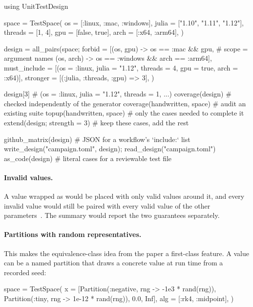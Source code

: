 \documentclass[11pt]{article}
\newcommand{\code}[1]{\texttt{\detokenize{#1}}}
\begin{document}
\begin{jlcode}
using UnitTestDesign

space = TestSpace(
    os      = [:linux, :mac, :windows],
    julia   = ["1.10", "1.11", "1.12"],
    threads = [1, 4],
    gpu     = [false, true],
    arch    = [:x64, :arm64],
)

design = all_pairs(space;
    forbid       = [(os, gpu)  -> os == :mac && gpu,             # scope = argument names
                    (os, arch) -> os == :windows && arch == :arm64],
    must_include = [(os = :linux, julia = "1.12", threads = 4, gpu = true, arch = :x64)],
    stronger     = [(:julia, :threads, :gpu) => 3],
)

design[3]                         # (os = :linux, julia = "1.12", threads = 1, ...)
coverage(design)                  # checked independently of the generator
coverage(handwritten, space)      # audit an existing suite
topup(handwritten, space)         # only the cases needed to complete it
extend(design; strength = 3)      # keep these cases, add the rest

github_matrix(design)             # JSON for a workflow's `include:` list
write_design("campaign.toml", design); read_design("campaign.toml")
as_code(design)                   # literal cases for a reviewable test file
\end{jlcode}

\paragraph{Invalid values.}
A value wrapped as \code{Invalid(-1)} would be placed with only valid values
around it, and every invalid value would still be paired with every valid
value of the other parameters~\cite{pict}. The summary would report the two
guarantees separately.

\paragraph{Partitions with random representatives.}
This makes the equivalence-class idea from the paper a first-class feature.
A value can be a named partition that draws a concrete value at run time
from a recorded seed:

\begin{jlcode}
space = TestSpace(
    x   = [Partition(:negative, rng -> -1e3 * rand(rng)),
           Partition(:tiny,     rng -> 1e-12 * rand(rng)),
           0.0, Inf],
    alg = [:rk4, :midpoint],
)
\end{jlcode}
\end{document}
